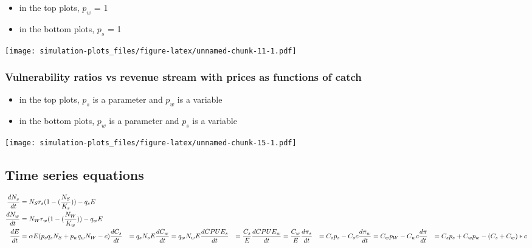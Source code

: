\documentclass[
]{article}
\providecommand{\tightlist}{%
  \setlength{\itemsep}{0pt}\setlength{\parskip}{0pt}}
\begin{document}
\begin{itemize}
\tightlist
\item
  in the top plots, \(p_w\) = 1
\item
  in the bottom plots, \(p_s\) = 1
\end{itemize}

\texttt{[image: simulation-plots\_files/figure-latex/unnamed-chunk-11-1.pdf]}

\hypertarget{vulnerability-ratios-vs-revenue-stream-with-prices-as-functions-of-catch}{%
\subsubsection{Vulnerability ratios vs revenue stream with prices as
functions of
catch}\label{vulnerability-ratios-vs-revenue-stream-with-prices-as-functions-of-catch}}

\begin{itemize}
\tightlist
\item
  in the top plots, \(p_s\) is a parameter and \(p_w\) is a variable
\item
  in the bottom plots, \(p_w\) is a parameter and \(p_s\) is a variable
\end{itemize}

\texttt{[image: simulation-plots\_files/figure-latex/unnamed-chunk-15-1.pdf]}

\hypertarget{time-series-equations}{%
\subsection{Time series equations}\label{time-series-equations}}

\[
\begin{align}
\frac{d N_s}{dt} &= N_S  r_s  (1 - (\frac{N_S}{K_s})) - q_s E \\
\newline
\frac{d N_w}{dt} &= N_W  r_w  (1 - (\frac{N_W}{K_w})) - q_w E \\
\newline
\frac{d E}{dt} &= \alpha  E  (p_s  q_s  N_S + p_w q_w N_W - c)
\newline
\frac{d C_s}{dt} &= q_s N_s E
\newline
\frac{d C_w}{dt} &= q_w N_w E
\newline
\frac{d CPUE_s}{dt} &= \frac{C_s} {E}
\newline
\frac{d CPUE_w}{dt} &= \frac{C_w} {E}
\newline
\frac{d \pi_s}{dt} &= C_s p_s - C_s  c
\newline
\frac{d \pi_w}{dt} &= C_w p_W - C_w  c
\newline
\frac{d \pi}{dt} &= C_s  p_s + C_w  p_w - (C_s + C_w) * c
\end{align}
\]
\end{document}
